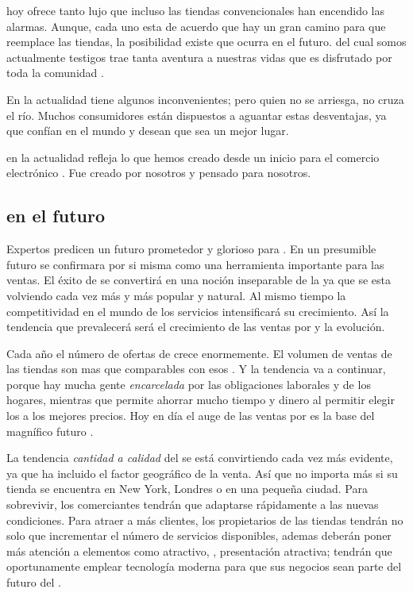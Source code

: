 \ecommerce hoy ofrece tanto lujo que incluso las tiendas convencionales han encendido las alarmas. Aunque, cada uno esta de acuerdo que hay un gran camino para que \ecommerce reemplace las tiendas, la posibilidad existe que ocurra en el futuro. \ecommerce del cual somos actualmente testigos trae tanta aventura a nuestras vidas que es disfrutado por toda la comunidad \online.

En la actualidad \ecommerce tiene algunos inconvenientes; pero quien no se arriesga, no cruza el río. Muchos consumidores están dispuestos a aguantar estas desventajas, ya que confían en el mundo \online y desean que sea un mejor lugar.

\ecommerce en la actualidad refleja lo que hemos creado desde un inicio para el comercio electrónico \online. Fue creado por nosotros y pensado para nosotros.

\subsection{\ecommerce en el futuro}

Expertos predicen un futuro prometedor y glorioso para \ecommerce. En un presumible futuro \ecommerce se confirmara por si misma como una herramienta importante para las ventas. El éxito de \ecommerce se convertirá en una noción inseparable de la \webINT ya que \eshopping se esta volviendo cada vez más y más popular y natural. Al mismo tiempo la competitividad en el mundo de los servicios \ecommerce intensificará su crecimiento. Así la tendencia que  prevalecerá \ecommerce será el crecimiento de las ventas por \internet y la evolución.

Cada año el número de ofertas de \ecommerce crece enormemente. El volumen de ventas de las tiendas \online  son mas que comparables con esos \brickandmortar. Y la tendencia va a continuar, porque hay mucha gente \textit{encarcelada} por las obligaciones laborales y de los hogares, mientras que \internet permite ahorrar mucho tiempo y dinero al permitir  elegir los \itemsCOM a los mejores precios. Hoy en día el auge de las ventas por \internet es la base del magnífico futuro \ecommerce.

La tendencia \textit{cantidad a calidad} del \ecommerce se está convirtiendo cada vez más evidente, ya que \internet ha incluido el factor geográfico de la venta. Así que no importa más si su tienda se encuentra en New York, Londres o en una pequeña ciudad. Para sobrevivir, los comerciantes tendrán que adaptarse rápidamente a las nuevas condiciones. Para atraer a más clientes, los propietarios de las tiendas \online tendrán no solo que incrementar el número de servicios disponibles, ademas deberán poner más atención a elementos como \designQA atractivo, \userfriendliness, presentación atractiva; tendrán que oportunamente emplear tecnología moderna para que sus negocios sean parte del futuro del \ecommerce.

